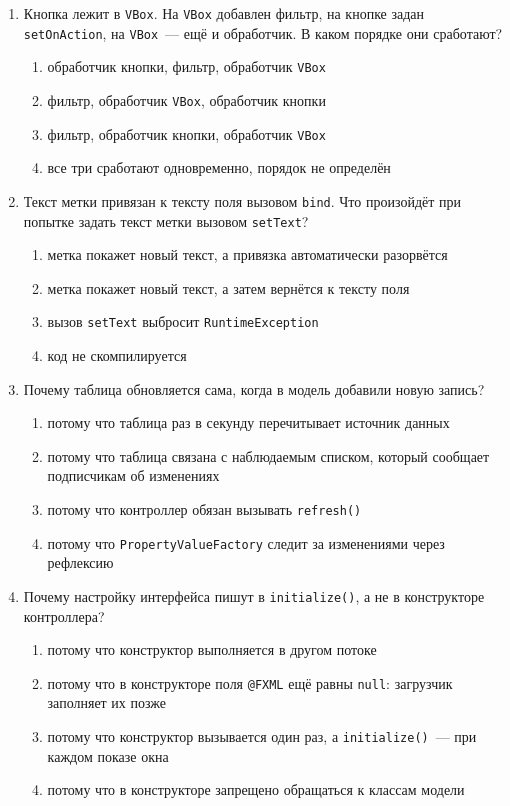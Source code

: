 \begin{enumerate}
\item Кнопка лежит в \texttt{VBox}. На \texttt{VBox} добавлен фильтр, на кнопке
      задан \texttt{setOnAction}, на \texttt{VBox}~--- ещё и обработчик. В каком
      порядке они сработают?
  \begin{enumerate}
    \item[а)] обработчик кнопки, фильтр, обработчик \texttt{VBox}
    \item[б)] фильтр, обработчик \texttt{VBox}, обработчик кнопки
    \item[в)] фильтр, обработчик кнопки, обработчик \texttt{VBox}
    \item[г)] все три сработают одновременно, порядок не определён
  \end{enumerate}

\item Текст метки привязан к тексту поля вызовом \texttt{bind}. Что произойдёт
      при попытке задать текст метки вызовом \texttt{setText}?
  \begin{enumerate}
    \item[а)] метка покажет новый текст, а привязка автоматически разорвётся
    \item[б)] метка покажет новый текст, а затем вернётся к тексту поля
    \item[в)] вызов \texttt{setText} выбросит \texttt{RuntimeException}
    \item[г)] код не скомпилируется
  \end{enumerate}

\item Почему таблица обновляется сама, когда в модель добавили новую запись?
  \begin{enumerate}
    \item[а)] потому что таблица раз в секунду перечитывает источник данных
    \item[б)] потому что таблица связана с наблюдаемым списком, который сообщает
              подписчикам об изменениях
    \item[в)] потому что контроллер обязан вызывать \texttt{refresh()}
    \item[г)] потому что \texttt{PropertyValueFactory} следит за изменениями
              через рефлексию
  \end{enumerate}

\item Почему настройку интерфейса пишут в \texttt{initialize()}, а не в
      конструкторе контроллера?
  \begin{enumerate}
    \item[а)] потому что конструктор выполняется в другом потоке
    \item[б)] потому что в конструкторе поля \texttt{@FXML} ещё равны
              \texttt{null}: загрузчик заполняет их позже
    \item[в)] потому что конструктор вызывается один раз, а
              \texttt{initialize()}~--- при каждом показе окна
    \item[г)] потому что в конструкторе запрещено обращаться к классам модели
  \end{enumerate}


\end{enumerate}
